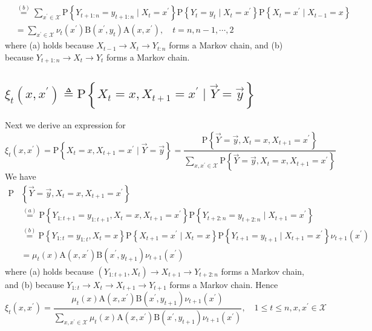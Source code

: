 \documentclass[11pt]{elegantbook}
\begin{document}
\begin{enumerate}[(1)]
$$\begin{aligned}
    & \stackrel{(b)}{=} \sum_{x^{\prime} \in \mathcal{X}} \mathrm{P}\left\{Y_{t+1: n}=y_{t+1: n} \mid X_t=x^{\prime}\right\} \mathrm{P}\left\{Y_t=y_t \mid X_t=x^{\prime}\right\} \mathrm{P}\left\{X_t=x^{\prime} \mid X_{t-1}=x\right\} \\
    &=\sum_{x^{\prime} \in \mathcal{X}} \nu_t\left(x^{\prime}\right) \mathrm{B}\left(x^{\prime}, y_t\right) \mathrm{A}\left(x, x^{\prime}\right), \quad t=n, n-1, \cdots, 2
    \end{aligned}
    $$
    where (a) holds because $X_{t-1} \rightarrow X_{t} \rightarrow Y_{t:n}$ forms a Markov chain, and (b) because $Y_{t+1: n} \rightarrow X_t \rightarrow Y_t$ forms a Markov chain.
\end{enumerate}

\subsection{$\xi_t\left(x, x^{\prime}\right) \triangleq \mathrm{P}\left\{X_t=x, X_{t+1}=x^{\prime} \mid \vec{Y}=\vec{y}\right\}$}
Next we derive an expression for
$$
\xi_t\left(x, x^{\prime}\right)=\mathrm{P}\left\{X_t=x, X_{t+1}=x^{\prime} \mid \vec{Y}=\vec{y}\right\}=\frac{\mathrm{P}\left\{\vec{Y}=\vec{y}, X_t=x, X_{t+1}=x^{\prime}\right\}}{\sum_{x, x^{\prime} \in \mathcal{X}} \mathrm{P}\left\{\vec{Y}=\vec{y}, X_t=x, X_{t+1}=x^{\prime}\right\}}
$$
We have
\begin{equation}
    \begin{aligned}
        \mathrm{P}&\left\{\vec{Y}=\vec{y}, X_t=x, X_{t+1}=x^{\prime}\right\}\\
        &\stackrel{(a)}{=} \mathrm{P}\left\{Y_{1: t+1}=y_{1: t+1}, X_t=x, X_{t+1}=x^{\prime}\right\} \mathrm{P}\left\{Y_{t+2: n}=y_{t+2: n} \mid X_{t+1}=x^{\prime}\right\}\\
        &\stackrel{(b)}{=} \mathrm{P}\left\{Y_{1: t}=y_{1: t}, X_t=x\right\} \mathrm{P}\left\{X_{t+1}=x^{\prime} \mid X_t=x\right\} \mathrm{P}\left\{Y_{t+1}=y_{t+1} \mid X_{t+1}=x^{\prime}\right\} \nu_{t+1}\left(x^{\prime}\right)\\
        &=\mu_t(x) \mathrm{A}\left(x, x^{\prime}\right) \mathrm{B}\left(x^{\prime}, y_{t+1}\right) \nu_{t+1}\left(x^{\prime}\right)
    \end{aligned}
    \nonumber
\end{equation}
where (a) holds because $\left(Y_{1: t+1}, X_t\right) \rightarrow X_{t+1} \rightarrow Y_{t+2: n}$ forms a Markov chain, and (b) because $Y_{1: t} \rightarrow X_t \rightarrow X_{t+1} \rightarrow Y_{t+1}$ forms a Markov chain. Hence
$$
\xi_t\left(x, x^{\prime}\right)=\frac{\mu_t(x) \mathrm{A}\left(x, x^{\prime}\right) \mathrm{B}\left(x^{\prime}, y_{t+1}\right) \nu_{t+1}\left(x^{\prime}\right)}{\sum_{x, x^{\prime} \in \mathcal{X}} \mu_t(x) \mathrm{A}\left(x, x^{\prime}\right) \mathrm{B}\left(x^{\prime}, y_{t+1}\right) \nu_{t+1}\left(x^{\prime}\right)}, \quad 1 \leq t \leq n, x, x^{\prime} \in \mathcal{X}
$$
\end{document}
